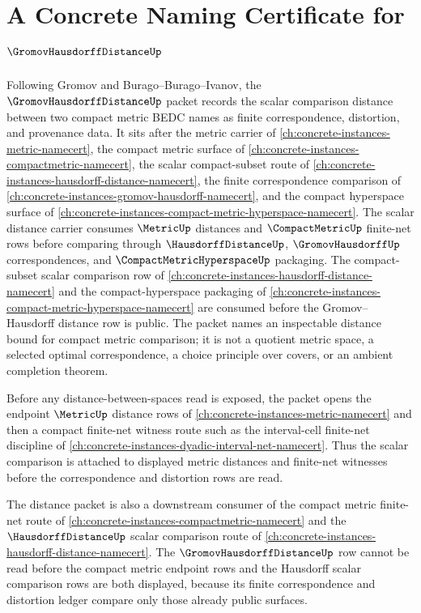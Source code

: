 \chapter{A Concrete Naming Certificate for $\GromovHausdorffDistanceUp$}
\label{ch:concrete-instances-gromov-hausdorff-distance-namecert}

Following Gromov and Burago--Burago--Ivanov, the $\GromovHausdorffDistanceUp$ packet records the scalar comparison distance between two compact metric BEDC names as finite correspondence, distortion, and provenance data. It sits after the metric carrier of \autoref{ch:concrete-instances-metric-namecert}, the compact metric surface of \autoref{ch:concrete-instances-compactmetric-namecert}, the scalar compact-subset route of \autoref{ch:concrete-instances-hausdorff-distance-namecert}, the finite correspondence comparison of \autoref{ch:concrete-instances-gromov-hausdorff-namecert}, and the compact hyperspace surface of \autoref{ch:concrete-instances-compact-metric-hyperspace-namecert}. The scalar distance carrier consumes $\MetricUp$ distances and $\CompactMetricUp$ finite-net rows before comparing through $\HausdorffDistanceUp$, $\GromovHausdorffUp$ correspondences, and $\CompactMetricHyperspaceUp$ packaging. The compact-subset scalar comparison row of \autoref{ch:concrete-instances-hausdorff-distance-namecert} and the compact-hyperspace packaging of \autoref{ch:concrete-instances-compact-metric-hyperspace-namecert} are consumed before the Gromov--Hausdorff distance row is public. The packet names an inspectable distance bound for compact metric comparison; it is not a quotient metric space, a selected optimal correspondence, a choice principle over covers, or an ambient completion theorem.

Before any distance-between-spaces read is exposed, the packet opens the endpoint $\MetricUp$ distance rows of \autoref{ch:concrete-instances-metric-namecert} and then a compact finite-net witness route such as the interval-cell finite-net discipline of \autoref{ch:concrete-instances-dyadic-interval-net-namecert}. Thus the scalar comparison is attached to displayed metric distances and finite-net witnesses before the correspondence and distortion rows are read.

The distance packet is also a downstream consumer of the compact metric finite-net route of \autoref{ch:concrete-instances-compactmetric-namecert} and the $\HausdorffDistanceUp$ scalar comparison route of \autoref{ch:concrete-instances-hausdorff-distance-namecert}. The $\GromovHausdorffDistanceUp$ row cannot be read before the compact metric endpoint rows and the Hausdorff scalar comparison rows are both displayed, because its finite correspondence and distortion ledger compare only those already public surfaces.

